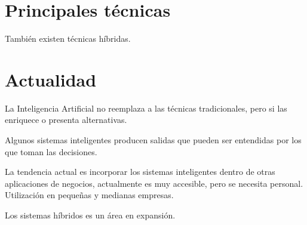 \documentclass[12pt, twoside, openright]{report} %
\begin{document}
\section{Principales técnicas}
\begin{table}[H]
	\centering
	\caption{Comparativa técnicas IA}
\end{table}
También existen técnicas híbridas.

\section{Actualidad}
La Inteligencia Artificial no reemplaza a las técnicas tradicionales, pero si las enriquece o presenta alternativas.

Algunos sistemas inteligentes producen salidas que pueden ser entendidas por los que toman las decisiones.

La tendencia actual es incorporar los sistemas inteligentes dentro de otras aplicaciones de negocios, actualmente es muy accesible, pero se necesita personal. Utilización en pequeñas y medianas empresas.

Los sistemas híbridos es un área en expansión.
\end{document}
